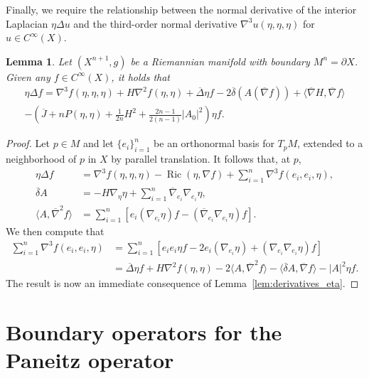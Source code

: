 \documentclass{amsart}
\newtheorem{lem}[thm]{Lemma}
\theoremstyle{definition}
\theoremstyle{remark}
\numberwithin{equation}{section}
\begin{document}
Finally, we require the relationship between the normal derivative of the interior Laplacian $\eta\Delta u$ and the third-order normal derivative $\nabla^3u(\eta,\eta,\eta)$ for $u\in C^\infty(X)$.

\begin{lem}
 \label{lem:3derivatives}
 Let $(X^{n+1},g)$ be a Riemannian manifold with boundary $M^n=\partial X$.  Given any $f\in C^\infty(X)$, it holds that
 \begin{multline*}
  \eta\Delta f = \nabla^3f(\eta,\eta,\eta) + H\nabla^2f(\eta,\eta) + {\overline{\Delta}}\eta f - 2{\overline{\delta}}\left(A({\overline{\nabla}} f)\right) + {\langle}{\overline{\nabla}} H,{\overline{\nabla}} f{\rangle} \\ - \left({\overline{J}} + nP(\eta,\eta) + \frac{1}{2n}H^2 + \frac{2n-1}{2(n-1)}{\lvert} A_0{\rvert}^2\right)\eta f .
 \end{multline*}
\end{lem}

\begin{proof}
 Let $p\in M$ and let $\{e_i\}_{i=1}^n$ be an orthonormal basis for $T_pM$, extended to a neighborhood of $p$ in $X$ by parallel translation.  It follows that, at $p$,
 \begin{align*}
  \eta\Delta f & = \nabla^3f(\eta,\eta,\eta) - \operatorname{Ric}(\eta,\nabla f) + \sum_{i=1}^n\nabla^3f(e_i,e_i,\eta) , \\
  {\overline{\delta}} A & = -H\nabla_\eta\eta + \sum_{i=1}^n{\overline{\nabla}}_{e_i}\nabla_{e_i}\eta , \\
  {\langle} A, {\overline{\nabla}}^2f{\rangle} & = \sum_{i=1}^n \left[ e_i\left(\nabla_{e_i}\eta\right)f - \left({\overline{\nabla}}_{e_i}\nabla_{e_i}\eta\right)f \right] .
 \end{align*}
 We then compute that
 \begin{align*}
  \sum_{i=1}^n\nabla^3f(e_i,e_i,\eta) & = \sum_{i=1}^n \left[ e_ie_i\eta f - 2e_i\left(\nabla_{e_i}\eta\right) + \left(\nabla_{e_i}\nabla_{e_i}\eta\right)f \right] \\
  & = {\overline{\Delta}}\eta f + H\nabla^2f(\eta,\eta) - 2{\langle} A,{\overline{\nabla}}^2f{\rangle} - {\langle}{\overline{\delta}} A,{\overline{\nabla}} f{\rangle} - {\lvert} A{\rvert}^2\eta f .
 \end{align*}
 The result is now an immediate consequence of Lemma~\ref{lem:derivatives_eta}.
\end{proof}

\section{Boundary operators for the Paneitz operator}
\label{sec:operators}
\end{document}
